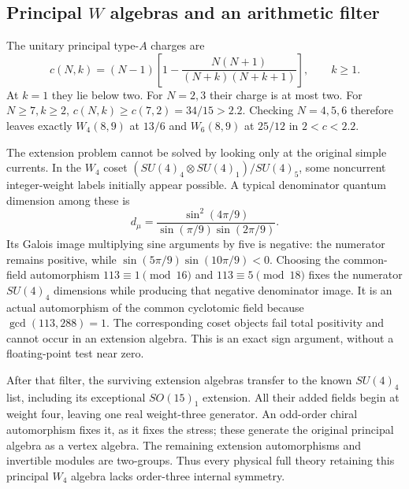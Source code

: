\subsection{Principal \texorpdfstring{$W$}{W} algebras and an arithmetic filter}

The unitary principal type-$A$ charges are
\[
 c(N,k)=(N-1)\left[1-
 \frac{N(N+1)}{(N+k)(N+k+1)}\right],\qquad k\geq1.
\]
At $k=1$ they lie below two. For $N=2,3$ their charge is at
most two. For $N\geq7,k\geq2$,
$c(N,k)\geq c(7,2)=34/15>2.2$. Checking $N=4,5,6$
therefore leaves exactly $W_4(8,9)$ at $13/6$ and
$W_6(8,9)$ at $25/12$ in $2<c<2.2$.

The extension problem cannot be solved by looking only at the
original simple currents. In the $W_4$ coset
$(SU(4)_4\otimes SU(4)_1)/SU(4)_5$, some noncurrent
integer-weight labels initially appear possible. A typical
denominator quantum dimension among these is
\[
 d_\mu=\frac{\sin^2(4\pi/9)}
 {\sin(\pi/9)\sin(2\pi/9)}.
\]
Its Galois image multiplying sine arguments by five is negative:
the numerator remains positive, while
$\sin(5\pi/9)\sin(10\pi/9)<0$. Choosing the common-field
automorphism $113\equiv1\pmod{16}$ and
$113\equiv5\pmod{18}$ fixes the numerator $SU(4)_4$
dimensions while producing that negative denominator image.
It is an actual automorphism of the common cyclotomic field
because $\gcd(113,288)=1$.
The corresponding coset objects fail total positivity and cannot
occur in an extension algebra. This is an exact sign argument,
without a floating-point test near zero.

After that filter, the surviving extension algebras transfer to
the known $SU(4)_4$ list, including its exceptional
$SO(15)_1$ extension. All their added fields begin at weight
four, leaving one real weight-three generator. An odd-order
chiral automorphism fixes it, as it fixes the stress; these
generate the original principal algebra as a vertex algebra.
The remaining extension automorphisms and invertible modules
are two-groups. Thus every physical full theory retaining this
principal $W_4$ algebra lacks order-three internal symmetry.


